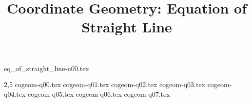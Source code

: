 \documentclass[a4paper,12pt]{article}
\begin{document}
\title{Coordinate Geometry: Equation of Straight Line}
\newcommand\event{S.3,4 Elite Mathematics Training}
\newcommand\learningobjective{
\item Revise basic proerties on coordinate plane
\item Learn basics of equation of straight line
\item Learn to find centers using coordinate geometry
}

\myfrontpage

{eq_of_straight_line-n00.tex}
\begin{question}[]{2,5}
    {cogeom-q00.tex}
    {cogeom-q01.tex}
    {cogeom-q02.tex}
    {cogeom-q03.tex}
    {cogeom-q04.tex}
    {cogeom-q05.tex}
    {cogeom-q06.tex}
    {cogeom-q07.tex}
\end{question}
\end{document}
